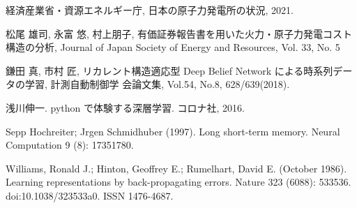 \clearpage
\begin{thebibliography}{99}

経済産業省・資源エネルギー庁, 日本の原子力発電所の状況, 2021.

松尾 雄司, 永富 悠, 村上朋子, 有価証券報告書を用いた火力・原子力発電コスト構造の分析, Journal of Japan Society of Energy and Resources, Vol. 33, No. 5

鎌田 真, 市村 匠, リカレント構造適応型 Deep Belief Network による時系列データの学習, 計測自動制御学 会論文集, Vol.54, No.8, 628/639(2018).

浅川伸一. python で体験する深層学習. コロナ社, 2016.

Sepp Hochreiter; Jrgen Schmidhuber (1997). Long short-term memory. Neural Computation 9 (8): 17351780.

Williams, Ronald J.; Hinton, Geoffrey E.; Rumelhart, David E. (October 1986). Learning representations by back-propagating errors. Nature 323 (6088): 533536. doi:10.1038/323533a0. ISSN 1476-4687.

\end{thebibliography}



